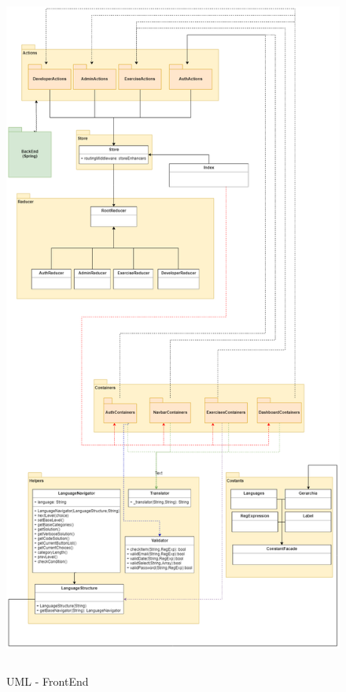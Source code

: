 \begin{figure}[H]
\centering
\includegraphics[width=18cm, height=23cm]{img/ReactSpec1.png} 
\caption{UML - FrontEnd}
\end{figure}

